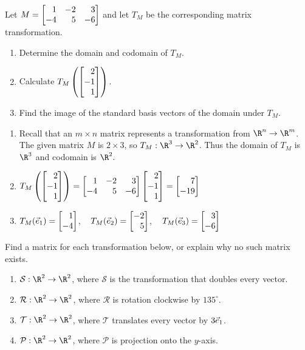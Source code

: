 \begin{exercises}
\begin{problist}
		\prob Let $M=\mat{1&-2&3\\-4&5&-6}$ and let $T_M$ be the corresponding matrix transformation.
		\begin{enumerate}
			\item Determine the domain and codomain of $T_M$.
			\item Calculate $T_M\left(\mat{2\\-1\\1}\right)$.
			\item Find the image of the standard basis vectors of the domain under $T_M$.
		\end{enumerate}
		\begin{solution}
			\begin{enumerate}
				\item Recall that an $m \times n$ matrix represents a transformation from $\R^n \rightarrow \R^m$. The given matrix $M$ is $2 \times 3$, so $T_{M} : \R^3 \rightarrow \R^2$. Thus the domain of $T_M$ is $\R^3$ and codomain is $\R^2.$
				\item $T_M \left( \mat{2\\-1\\1}\right) = \mat{1 & -2 & 3 \\ -4 & 5 & -6}\mat{2\\-1\\1} = \mat{7\\ -19}$
				\item $T_M(\vec{e}_1) = \mat{1\\-4}$, $\;\;\; T_M(\vec{e}_2) = \mat{-2 \\ 5}$, $\;\;\; T_M(\vec{e}_3) = \mat{3\\-6}$
			\end{enumerate}
		\end{solution}

		\prob Find a matrix for each transformation below, or explain why no such matrix exists.
		\begin{enumerate}
			\item $\mathcal S:\R^{2}\to\R^{2}$, where $\mathcal S$ is the
				transformation that doubles every vector.

			\item $\mathcal R:\R^{2}\to\R^{2}$, where $\mathcal R$
				is rotation clockwise by $135^{\circ}$.

			\item $\mathcal T:\R^2\to\R^2$, where $\mathcal T$ translates every vector by $3{\vec e_1}$.

			\item $\mathcal P:\R^{2}\to\R^{2}$, where $\mathcal P$
				is projection onto the $y$-axis.


\end{enumerate}
\end{problist}
\end{exercises}
